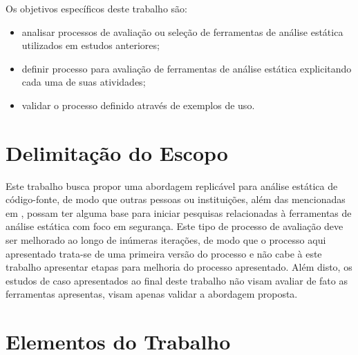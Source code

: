 Os objetivos específicos deste trabalho são:
\begin{itemize}
    \item analisar processos de avaliação ou seleção de ferramentas de análise estática utilizados em estudos anteriores;
    \item definir processo para avaliação de ferramentas de análise estática explicitando cada uma de suas atividades;
    \item validar o processo definido através de exemplos de uso.
\end{itemize}
\section*{Delimitação do Escopo}

Este trabalho busca propor uma abordagem replicável para análise estática de código-fonte, de modo que outras pessoas ou instituições, além das mencionadas em , possam ter alguma base para iniciar pesquisas relacionadas à ferramentas de análise estática com foco em segurança. Este tipo de processo de avaliação deve ser melhorado ao longo de inúmeras iterações, de modo que o processo aqui apresentado trata-se de uma primeira versão do processo e não cabe à este trabalho apresentar etapas para melhoria do processo apresentado. Além disto, os estudos de caso apresentados ao final deste trabalho não visam avaliar de fato as ferramentas apresentas, visam apenas validar a abordagem proposta.


\section*{Elementos do Trabalho}

